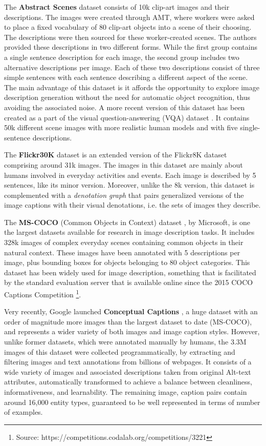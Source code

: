The \textbf{Abstract Scenes} dataset \citep{Zitnick2013} consists of 10k clip-art images and their descriptions. The images were created through AMT, where workers were asked to place a fixed vocabulary of 80 clip-art objects into a scene of their choosing. The descriptions were then sourced for these worker-created scenes. The authors provided these descriptions in two different forms. While the first group contains a single sentence description for each image, the second group includes two alternative descriptions per image. Each of these two descriptions consist of three simple sentences with each sentence describing a different aspect of the scene. The main advantage of this dataset is it affords the opportunity to explore image description generation without the need for automatic object recognition, thus avoiding the associated noise. A more recent version of this dataset has been created as a part of the visual question-answering (VQA) dataset \citep{Antol2015}. It contains 50k different scene images with more realistic human models and with five single-sentence descriptions. 

The \textbf{Flickr30K} dataset \citep{Young2014} is an extended version of the Flickr8K dataset comprising around 31k images. The images in this dataset are mainly about humans involved in everyday activities and events. Each image is described by 5 sentences, like its minor version. Moreover, unlike the 8k version, this dataset is complemented with a \textit{denotation graph} that pairs generalized versions of the image captions with their visual denotations, i.e. the sets of images they describe.

The \textbf{MS-COCO} (Common Objects in Context) dataset \citep{Lin2014}, by Microsoft, is one the largest datasets available for research in image description tasks. It includes 328k images of complex everyday scenes containing common objects in their natural context.  These images have been annotated with 5 descriptions per image, plus bounding boxes for objects belonging to 80 object categories. This dataset has been widely used for image description, something that is facilitated by the standard evaluation server that is available online since the 2015 COCO Captions Competition \footnote{Source: https://competitions.codalab.org/competitions/3221}. 

Very recently, Google launched \textbf{Conceptual Captions} \citep{Sharma2018}, a huge dataset with an order of magnitude more images than the largest dataset to date (MS-COCO), and represents a wider variety of both images and image caption styles. However, unlike former datasets, which were annotated manually by humans, the 3.3M images of this dataset were collected programmatically, by extracting and filtering images and text annotations from billions of webpages. It consists of a wide variety of images and associated descriptions taken from original Alt-text attributes, automatically transformed to achieve a balance between cleanliness, informativeness, and learnability. The remaining image, caption pairs contain around 16,000 entity types, guaranteed to be well represented in terms of number of examples.

